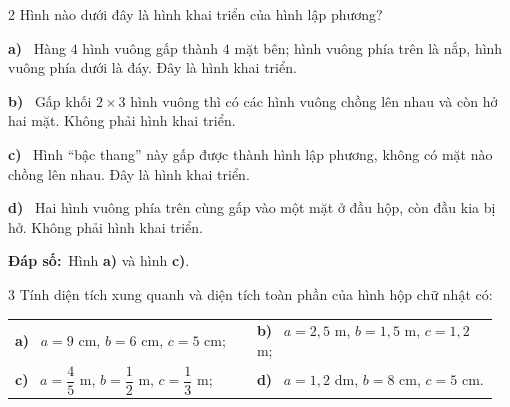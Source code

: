 \documentclass[11pt]{article}
\makeatletter
\newif\ifsol \solfalse
\renewcommand{\arraystretch}{1.35}
\providecommand{\AnsWord}{Đáp số}
\newcommand{\dapso}[1]{\par\textbf{\AnsWord:}\ #1}
\newcommand{\probsol}[1]{%
  \begin{lrbox}{\solmeasure}\begin{minipage}{\dimexpr\linewidth-24pt\relax}#1\end{minipage}\end{lrbox}%
  \ifsol
    \begin{solbox}#1\end{solbox}%
  \else
    \setlength{\solht}{\dimexpr\ht\solmeasure+\dp\solmeasure+0.85cm\relax}%
    \ifdim\solht<1.35cm\setlength{\solht}{1.35cm}\fi
    \begin{tcolorbox}[colback=white,colframe=Line,boxrule=0.8pt,arc=5pt,
      left=8pt,right=8pt,top=4pt,bottom=4pt,height=\solht]{\footnotesize\color{Slate}\itshape\WorkWord}\end{tcolorbox}%
  \fi}
\newcommand{\pa}[1]{\textbf{#1)}\ }
\newenvironment{cols2}{\par\vspace{3pt}\noindent\setlength{\tabcolsep}{0pt}\renewcommand{\arraystretch}{1.3}%
  \begin{tabular}{@{}>{\raggedright\arraybackslash\rule{0pt}{4.4ex}}p{0.48\linewidth}<{\rule[-2.3ex]{0pt}{0pt}}@{\hspace{0.03\linewidth}}>{\raggedright\arraybackslash\rule{0pt}{4.4ex}}p{0.48\linewidth}<{\rule[-2.3ex]{0pt}{0pt}}@{}}}%
  {\end{tabular}\par}
\newcommand{\gap}{\vspace{0.3cm}}
\def\WorkWord{Bài làm:}
\def\AnsWord{Đáp số}
\makeatother
\begin{document}
\gap
\begin{probbox}{2}{\relax}
Hình nào dưới đây là hình khai triển của hình lập phương?\par\smallskip
\begin{center}
\end{center}
\end{probbox}
\probsol{
\pa{a} Hàng $4$ hình vuông gấp thành $4$ mặt bên; hình vuông phía trên là nắp, hình vuông phía dưới là đáy. Đây là hình khai triển.\par
\pa{b} Gấp khối $2\times3$ hình vuông thì có các hình vuông chồng lên nhau và còn hở hai mặt. Không phải hình khai triển.\par
\pa{c} Hình ``bậc thang'' này gấp được thành hình lập phương, không có mặt nào chồng lên nhau. Đây là hình khai triển.\par
\pa{d} Hai hình vuông phía trên cùng gấp vào một mặt ở đầu hộp, còn đầu kia bị hở. Không phải hình khai triển.
\dapso{Hình \textbf{a)} và hình \textbf{c)}.}}
\gap
\begin{probbox}{3}{\relax}
Tính diện tích xung quanh và diện tích toàn phần của hình hộp chữ nhật có:
\begin{cols2}
\pa{a} $a=9$ cm, $b=6$ cm, $c=5$ cm; & \pa{b} $a=2{,}5$ m, $b=1{,}5$ m, $c=1{,}2$ m;\\
\pa{c} $a=\dfrac45$ m, $b=\dfrac12$ m, $c=\dfrac13$ m; & \pa{d} $a=1{,}2$ dm, $b=8$ cm, $c=5$ cm.
\end{cols2}
\end{probbox}
\end{document}
